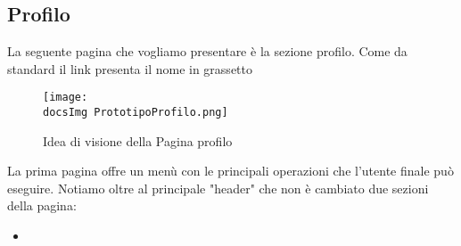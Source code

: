 {	\subsection{Profilo}{
		La seguente pagina che vogliamo presentare è la sezione profilo. Come da standard il link presenta il nome in grassetto \\
		\begin{figure}[ht]
			\centering
			\texttt{[image: \\docsImg PrototipoProfilo.png]}
			\caption{Idea di visione della Pagina profilo}
			\label{PrototipoProfilo}
		\end{figure}
		La prima pagina offre un menù con le principali operazioni che l'utente finale può eseguire. Notiamo oltre al principale "header" che non è cambiato due sezioni della pagina:
		\begin{itemize}
			\item 
		\end{itemize}	
	}		
}
